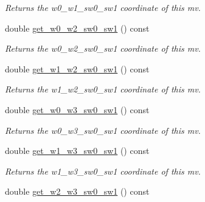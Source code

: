 \begin{DoxyCompactItemize}
\begin{DoxyCompactList}\small\item\em Returns the w0\-\_\-w1\-\_\-sw0\-\_\-sw1 coordinate of this mv. \end{DoxyCompactList}\item 
\hypertarget{classe3ga_1_1mv_ab199d403a0e62bb225a3046e81ac64d2}{double \hyperlink{classe3ga_1_1mv_ab199d403a0e62bb225a3046e81ac64d2}{get\-\_\-w0\-\_\-w2\-\_\-sw0\-\_\-sw1} () const }\label{classe3ga_1_1mv_ab199d403a0e62bb225a3046e81ac64d2}

\begin{DoxyCompactList}\small\item\em Returns the w0\-\_\-w2\-\_\-sw0\-\_\-sw1 coordinate of this mv. \end{DoxyCompactList}\item 
\hypertarget{classe3ga_1_1mv_aa631083d4fb7c2c6e29f9e981c0fc7e5}{double \hyperlink{classe3ga_1_1mv_aa631083d4fb7c2c6e29f9e981c0fc7e5}{get\-\_\-w1\-\_\-w2\-\_\-sw0\-\_\-sw1} () const }\label{classe3ga_1_1mv_aa631083d4fb7c2c6e29f9e981c0fc7e5}

\begin{DoxyCompactList}\small\item\em Returns the w1\-\_\-w2\-\_\-sw0\-\_\-sw1 coordinate of this mv. \end{DoxyCompactList}\item 
\hypertarget{classe3ga_1_1mv_ae60a9371fc2723b443a775ba514f8f21}{double \hyperlink{classe3ga_1_1mv_ae60a9371fc2723b443a775ba514f8f21}{get\-\_\-w0\-\_\-w3\-\_\-sw0\-\_\-sw1} () const }\label{classe3ga_1_1mv_ae60a9371fc2723b443a775ba514f8f21}

\begin{DoxyCompactList}\small\item\em Returns the w0\-\_\-w3\-\_\-sw0\-\_\-sw1 coordinate of this mv. \end{DoxyCompactList}\item 
\hypertarget{classe3ga_1_1mv_a6ea74c1b75013eaae5dd96c0d071982a}{double \hyperlink{classe3ga_1_1mv_a6ea74c1b75013eaae5dd96c0d071982a}{get\-\_\-w1\-\_\-w3\-\_\-sw0\-\_\-sw1} () const }\label{classe3ga_1_1mv_a6ea74c1b75013eaae5dd96c0d071982a}

\begin{DoxyCompactList}\small\item\em Returns the w1\-\_\-w3\-\_\-sw0\-\_\-sw1 coordinate of this mv. \end{DoxyCompactList}\item 
\hypertarget{classe3ga_1_1mv_a93e7e40d747742646446e500e86e0eff}{double \hyperlink{classe3ga_1_1mv_a93e7e40d747742646446e500e86e0eff}{get\-\_\-w2\-\_\-w3\-\_\-sw0\-\_\-sw1} () const }\label{classe3ga_1_1mv_a93e7e40d747742646446e500e86e0eff}


\end{DoxyCompactItemize}
